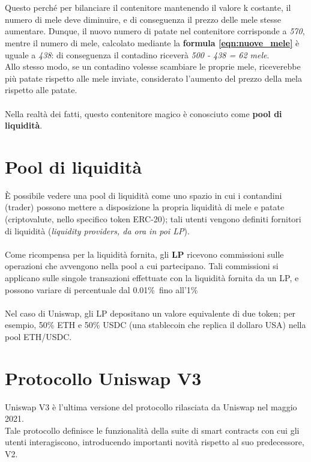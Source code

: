 \documentclass[12pt,a4paper]{report}
\begin{document}
\noindent \\\\Questo perché per bilanciare il contenitore mantenendo il valore k costante, il numero di mele deve diminuire, e di conseguenza il prezzo delle mele stesse aumentare.
Dunque, il nuovo numero di patate nel contenitore corrisponde a \textit{570}, mentre il numero di mele, calcolato mediante la \textbf{formula \ref{eqn:nuove_mele}} è uguale a \textit{438}: di conseguenza il contadino riceverà \textit{500 - 438 = 62 mele}.
\\Allo stesso modo, se un contadino volesse scambiare le proprie mele, riceverebbe più patate rispetto alle mele inviate, considerato l'aumento del prezzo della mela rispetto alle patate.
\\\\Nella realtà dei fatti, questo contenitore magico è conosciuto come \textbf{pool di liquidità}.

\section{Pool di liquidità}

È possibile vedere una pool di liquidità come uno spazio in cui i contandini (trader) possono mettere a disposizione la propria liquidità di mele e patate (criptovalute, nello specifico token ERC-20\cite{erc_20}); tali utenti vengono definiti fornitori di liquidità (\textit{liquidity providers, da ora in poi LP}).
\\\\Come ricompensa per la liquidità fornita, gli \textbf{LP} ricevono commissioni sulle operazioni che avvengono nella pool a cui partecipano. 
Tali commissioni si applicano sulle singole transazioni effettuate con la liquidità fornita da un LP, e possono variare di percentuale dal 0.01\%\ fino all'1\%\.\\\\Nel caso di Uniswap, gli LP depositano un valore equivalente di due token; per esempio, 50\% ETH e 50\% USDC (una stablecoin che replica il dollaro USA) nella pool ETH/USDC.


\section{Protocollo Uniswap V3}

Uniswap V3 è l'ultima versione del protocollo rilasciata da Uniswap nel maggio 2021.\\ Tale protocollo definisce le funzionalità della suite di smart contracts con cui gli utenti interagiscono, introducendo importanti novità rispetto al suo predecessore, V2.
\end{document}
